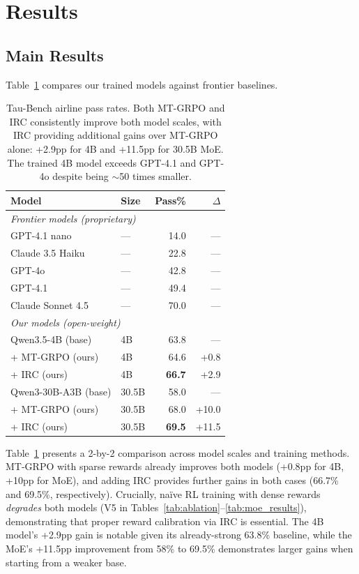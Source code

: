 \documentclass[11pt]{article}
\newcommand{\irc}{\textsc{IRC}}
\begin{document}
\section{Results}
\label{sec:results}

\subsection{Main Results}

Table~\ref{tab:main_results} compares our trained models against frontier baselines.

\begin{table}[t]
\centering
\small
\begin{tabular}{llrr}
\toprule
\textbf{Model} & \textbf{Size} & \textbf{Pass\%} & \textbf{$\Delta$} \\
\midrule
\multicolumn{4}{l}{\emph{Frontier models (proprietary)}} \\
GPT-4.1 nano & --- & 14.0 & --- \\
Claude 3.5 Haiku & --- & 22.8 & --- \\
GPT-4o & --- & 42.8 & --- \\
GPT-4.1 & --- & 49.4 & --- \\
Claude Sonnet 4.5 & --- & 70.0 & --- \\
\midrule
\multicolumn{4}{l}{\emph{Our models (open-weight)}} \\
Qwen3.5-4B (base) & 4B & 63.8 & --- \\
\quad + MT-GRPO (ours) & 4B & 64.6 & +0.8 \\
\quad + \irc{} (ours) & 4B & \textbf{66.7} & +2.9 \\
Qwen3-30B-A3B (base) & 30.5B & 58.0 & --- \\
\quad + MT-GRPO (ours) & 30.5B & 68.0 & +10.0 \\
\quad + \irc{} (ours) & 30.5B & \textbf{69.5} & +11.5 \\
\bottomrule
\end{tabular}
\caption{Tau-Bench airline pass rates. Both MT-GRPO and \irc{} consistently improve both model scales, with \irc{} providing additional gains over MT-GRPO alone: +2.9pp for 4B and +11.5pp for 30.5B MoE. The trained 4B model exceeds GPT-4.1 and GPT-4o despite being $\sim$50 times smaller.}
\label{tab:main_results}
\end{table}

Table~\ref{tab:main_results} presents a 2-by-2 comparison across model scales and training methods. MT-GRPO with sparse rewards already improves both models (+0.8pp for 4B, +10pp for MoE), and adding \irc{} provides further gains in both cases (66.7\% and 69.5\%, respectively). Crucially, na\"ive RL training with dense rewards \emph{degrades} both models (V5 in Tables~\ref{tab:ablation}--\ref{tab:moe_results}), demonstrating that proper reward calibration via \irc{} is essential. The 4B model's +2.9pp gain is notable given its already-strong 63.8\% baseline, while the MoE's +11.5pp improvement from 58\% to 69.5\% demonstrates larger gains when starting from a weaker base.
\end{document}
